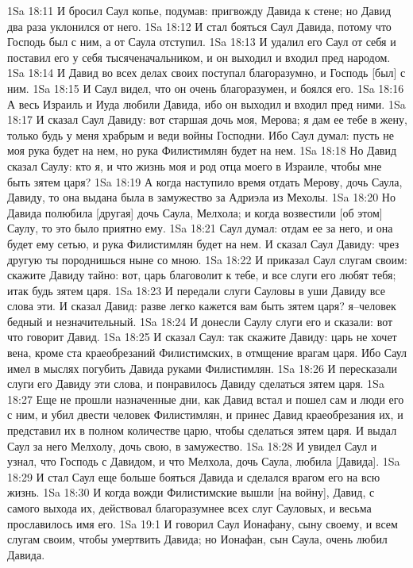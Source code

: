 1Sa 18:11  И бросил Саул копье, подумав: пригвожду Давида к стене; но Давид два раза уклонился от него.
1Sa 18:12  И стал бояться Саул Давида, потому что Господь был с ним, а от Саула отступил.
1Sa 18:13  И удалил его Саул от себя и поставил его у себя тысяченачальником, и он выходил и входил пред народом.
1Sa 18:14  И Давид во всех делах своих поступал благоразумно, и Господь [был] с ним.
1Sa 18:15  И Саул видел, что он очень благоразумен, и боялся его.
1Sa 18:16  А весь Израиль и Иуда любили Давида, ибо он выходил и входил пред ними.
1Sa 18:17  И сказал Саул Давиду: вот старшая дочь моя, Мерова; я дам ее тебе в жену, только будь у меня храбрым и веди войны Господни. Ибо Саул думал: пусть не моя рука будет на нем, но рука Филистимлян будет на нем.
1Sa 18:18  Но Давид сказал Саулу: кто я, и что жизнь моя и род отца моего в Израиле, чтобы мне быть зятем царя?
1Sa 18:19  А когда наступило время отдать Мерову, дочь Саула, Давиду, то она выдана была в замужество за Адриэла из Мехолы.
1Sa 18:20  Но Давида полюбила [другая] дочь Саула, Мелхола; и когда возвестили [об этом] Саулу, то это было приятно ему.
1Sa 18:21  Саул думал: отдам ее за него, и она будет ему сетью, и рука Филистимлян будет на нем. И сказал Саул Давиду: чрез другую ты породнишься ныне со мною.
1Sa 18:22  И приказал Саул слугам своим: скажите Давиду тайно: вот, царь благоволит к тебе, и все слуги его любят тебя; итак будь зятем царя.
1Sa 18:23  И передали слуги Сауловы в уши Давиду все слова эти. И сказал Давид: разве легко кажется вам быть зятем царя? я--человек бедный и незначительный.
1Sa 18:24  И донесли Саулу слуги его и сказали: вот что говорит Давид.
1Sa 18:25  И сказал Саул: так скажите Давиду: царь не хочет вена, кроме ста краеобрезаний Филистимских, в отмщение врагам царя. Ибо Саул имел в мыслях погубить Давида руками Филистимлян.
1Sa 18:26  И пересказали слуги его Давиду эти слова, и понравилось Давиду сделаться зятем царя.
1Sa 18:27  Еще не прошли назначенные дни, как Давид встал и пошел сам и люди его с ним, и убил двести человек Филистимлян, и принес Давид краеобрезания их, и представил их в полном количестве царю, чтобы сделаться зятем царя. И выдал Саул за него Мелхолу, дочь свою, в замужество.
1Sa 18:28  И увидел Саул и узнал, что Господь с Давидом, и что Мелхола, дочь Саула, любила [Давида].
1Sa 18:29  И стал Саул еще больше бояться Давида и сделался врагом его на всю жизнь.
1Sa 18:30  И когда вожди Филистимские вышли [на войну], Давид, с самого выхода их, действовал благоразумнее всех слуг Сауловых, и весьма прославилось имя его.
1Sa 19:1  И говорил Саул Ионафану, сыну своему, и всем слугам своим, чтобы умертвить Давида; но Ионафан, сын Саула, очень любил Давида.
